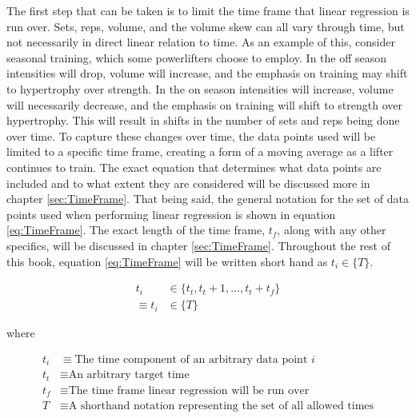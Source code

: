 The first step that can be taken is to limit the time frame that linear regression is run over. Sets, reps, volume, and the volume skew can all vary through time, but not necessarily in direct linear relation to time. As an example of this, consider seasonal training, which some powerlifters choose to employ. In the off season intensities will drop, volume will increase, and the emphasis on training may shift to hypertrophy over strength. In the on season intensities will increase, volume will necessarily decrease, and the emphasis on training will shift to strength over hypertrophy. This will result in shifts in the number of sets and reps being done over time. To capture these changes over time, the data points used will be limited to a specific time frame, creating a form of a moving average as a lifter continues to train. The exact equation that determines what data points are included and to what extent they are considered will be discussed more in chapter \ref{sec:TimeFrame}. That being said, the general notation for the set of data points used when performing linear regression is shown in equation \ref{eq:TimeFrame}. The exact length of the time frame, $t_f$, along with any other specifics, will be discussed in chapter \ref{sec:TimeFrame}. Throughout the rest of this book, equation \ref{eq:TimeFrame} will be written short hand as $t_i\in \{ T \}$.

\begin{equation}
    \label{eq:TimeFrame}
    \begin{split}
        t_i & \in\{ t_t, t_t+1,\dots,t_t+t_f \} \\
        \equiv t_i & \in \{ T \}
    \end{split}
\end{equation}
\centerline{where}
\begin{equation*}
    \begin{split}
        t_i &\equiv \text{The time component of an arbitrary data point }i \\
        t_t &\equiv \text{An arbitrary target time} \\
        t_f &\equiv \text{The time frame linear regression will be run over} \\
        T & \equiv \text{A shorthand notation representing the set of all allowed times}
    \end{split}
\end{equation*}

